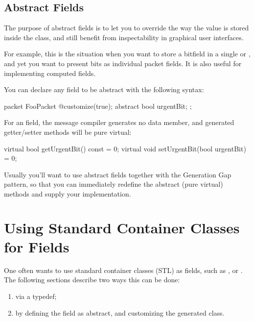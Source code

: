 \subsection{Abstract Fields}
\label{sec:msg-defs:abstract-fields}

The purpose of abstract fields is to let you to override the way the value
is stored inside the class, and still benefit from inspectability in
graphical user interfaces.

For example, this is the situation when you want to store a bitfield
in a single  or , and yet you want
to present bits as individual packet fields.
It is also useful for implementing computed fields.

You can declare any field to be abstract with the following syntax:

\begin{msg}
packet FooPacket
{
   @customize(true);
   abstract bool urgentBit;
};
\end{msg}

For an  field, the message compiler generates
no data member, and generated getter/setter methods will be pure
virtual:

\begin{cpp}
virtual bool getUrgentBit() const = 0;
virtual void setUrgentBit(bool urgentBit) = 0;
\end{cpp}


Usually you'll want to use abstract fields together with
the Generation Gap pattern, so that you can immediately
redefine the abstract (pure virtual) methods and
supply your implementation.



\section{Using Standard Container Classes for Fields}
\label{sec:msg-defs:using-stl}

One often wants to use standard container classes (STL) as fields, such as
,  or . The following sections
describe two ways this can be done:

\begin{enumerate}
  \item via a typedef;
  \item by defining the field as abstract, and customizing the generated class.
\end{enumerate}

